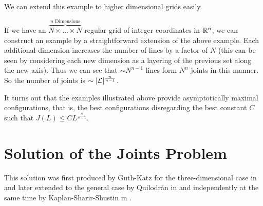 We can extend this example to higher dimensional grids easily. 
\begin{example}
If we have an $\overbrace{N \times \dots \times N}^{n \text{ Dimensions}}$ regular grid of integer coordinates in $\mathbb R^n$, we can construct an example  by a straightforward extension
of the above example. Each additional dimension increases the number of lines by a factor of $N$ (this can be seen by considering each new dimension as a layering of the previous set along the new axis).
Thus we can see that $\sim N^{n-1}$ lines form $N^n$ joints in this manner. So the number of joints is $\sim |\mathcal L|^{\frac{n}{n-1}}$.
\end{example}

It turns out that the examples illustrated above provide asymptotically maximal configurations, that is, the best configurations disregarding the best constant $C$ such that $J(L) \leq CL^{\frac{n}{n-1}}$.
\section{Solution of the Joints Problem}
This solution was first produced by Guth-Katz for the three-dimensional case in \cite{guth2008algebraic} and later extended to the general case by Quilodrán in \cite{quilodran2009joints} and independently at the same time by 
Kaplan-Sharir-Shustin in \cite{kaplan2009lines}.  


